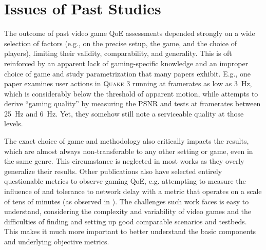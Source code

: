\section{Issues of Past Studies}
\label{sec:relatedwork}

The outcome of past video game \gls{QoE} assessments depended strongly on a wide selection of factors (e.g., on the precise setup, the game, and the choice of players), limiting their validity, comparability, and generality. This is oft reinforced by an apparent lack of gaming-specific knowledge and an improper choice of game and study parametrization that many papers exhibit. E.g., one paper \cite{claypool2007} examines user actions in \textsc{Quake 3} running at framerates as low as \SI{3}{\hertz}, which is considerably below the threshold of apparent motion, while \cite{5506572} attempts to derive ``gaming quality'' by measuring the \acrshort{PSNR} and tests at framerates between \SI{25}{\hertz} and \SI{6}{\hertz}. Yet, they somehow still note a serviceable quality at those levels.

The exact choice of game and methodology also critically impacts the results, which are almost always non-transferable to any other setting or game, even in the same genre. This circumstance is neglected in most works as they overly generalize their results. 
Other publications also have selected entirely questionable metrics to observe gaming \gls{QoE}, e.g. attempting to measure the influence of and tolerance to network delay with a metric that operates on a scale of tens of minutes (as observed in \cite{Claypool:2006:LPA:1167838.1167860}). The challenges such work faces is easy to understand, considering the complexity and variability of video games and the difficulties of finding and setting up good comparable scenarios and testbeds. This makes it much more important to better understand the basic components and underlying objective metrics.



